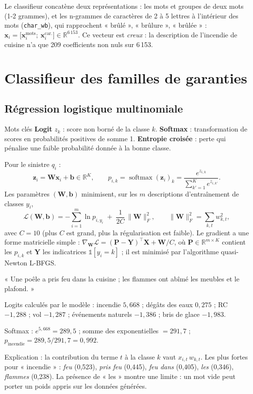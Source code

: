 \documentclass[11pt,a4paper]{article}
\newcommand{\R}{\mathbb{R}}
\newcommand{\vect}[1]{\bm{#1}}
\newcommand{\mat}[1]{\mathbf{#1}}
\DeclareMathOperator{\softmax}{softmax}
\begin{document}
Le classifieur concatène deux représentations : les mots et groupes de deux mots (1-2 grammes), et
les n-grammes de caractères de 2 à 5 lettres à l'intérieur des mots (\texttt{char\_wb}), qui
rapprochent « brûlé », « brûlure », « brûlée » :
$\vect{x}_i = \big[\vect{x}_i^{\text{mots}};\ \vect{x}_i^{\text{car.}}\big] \in \R^{6\,153}$.
Ce vecteur est \emph{creux} : la description de l'incendie de cuisine n'a que 209 coefficients non
nuls sur 6\,153.

\section{Classifieur des familles de garanties}

\subsection{Régression logistique multinomiale}
\begin{defbox}{Mots clés}
\textbf{Logit} $z_k$ : score non borné de la classe $k$. \textbf{Softmax} : transformation de
scores en probabilités positives de somme 1. \textbf{Entropie croisée} : perte qui pénalise une
faible probabilité donnée à la bonne classe.
\end{defbox}
Pour le sinistre $q_i$ :
\[
\vect{z}_i = \mat{W}\vect{x}_i + \vect{b} \in \R^K,\qquad
p_{i,k} = \softmax(\vect{z}_i)_k = \frac{e^{z_{i,k}}}{\sum_{k'=1}^{K} e^{z_{i,k'}}} .
\]
Les paramètres $(\mat{W},\vect{b})$ minimisent, sur les $m$ descriptions d'entraînement de classes
$y_i$,
\[
\mathcal{L}(\mat{W},\vect{b}) = -\sum_{i=1}^{m} \ln p_{i,y_i} \;+\; \frac{1}{2C}\,\|\mat{W}\|_F^2 ,
\qquad \|\mat{W}\|_F^2=\sum_{k,t} w_{k,t}^2,
\]
avec $C=10$ (plus $C$ est grand, plus la régularisation est faible). Le gradient a une forme
matricielle simple :
$\nabla_{\mat{W}}\mathcal{L} = (\mat{P}-\mat{Y})^\top\mat{X} + \mat{W}/C$, où $\mat{P}\in\R^{m\times K}$
contient les $p_{i,k}$ et $\mat{Y}$ les indicatrices $\mathbb{1}[y_i=k]$ ; il est minimisé par
l'algorithme quasi-Newton L-BFGS.

\begin{exemple}
« Une poêle a pris feu dans la cuisine ; les flammes ont abîmé les meubles et le plafond. »

Logits calculés par le modèle : incendie $5{,}668$ ; dégâts des eaux $0{,}275$ ;
RC $-1{,}288$ ; vol $-1{,}287$ ; événements naturels $-1{,}386$ ; bris de glace $-1{,}983$.

Softmax : $e^{5{,}668} = 289{,}5$ ; somme des exponentielles $= 291{,}7$ ;
$p_{\text{incendie}} = 289{,}5/291{,}7 = 0{,}992$.

Explication : la contribution du terme $t$ à la classe $k$ vaut $x_{i,t}\,w_{k,t}$. Les plus fortes
pour « incendie » : \emph{feu} (0,523), \emph{pris feu} (0,445), \emph{feu dans} (0,405),
\emph{les} (0,346), \emph{flammes} (0,238). La présence de « les » montre une limite : un mot vide
peut porter un poids appris sur les données générées.
\end{exemple}
\end{document}
